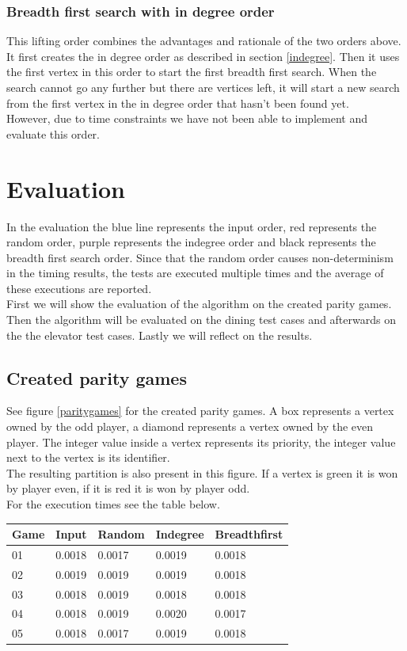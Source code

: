 \documentclass[10pt,a4paper]{article}
\begin{document}
\subsubsection{Breadth first search with in degree order}
This lifting order combines the advantages and rationale of the two orders above. It first creates the in degree order as described in section \ref{indegree}. Then it uses the first vertex in this order to start the first breadth first search. When the search cannot go any further but there are vertices left, it will start a new search from the first vertex in the in degree order that hasn't been found yet.\\
However, due to time constraints we have not been able to implement and evaluate this order. 

\section{Evaluation}\label{eval}

In the evaluation the blue line represents the input order, red represents the random order, purple represents the indegree order and black represents the breadth first search order. Since that the random order causes non-determinism in the timing results, the tests are executed multiple times and the average of these executions are reported.\\
First we will show the evaluation of the algorithm on the created parity games. Then the algorithm will be evaluated on the dining test cases and afterwards on the the elevator test cases. Lastly we will reflect on the results.

\subsection{Created parity games}

See figure \ref{paritygames} for the created parity games. A box represents a vertex owned by the odd player, a diamond represents a vertex owned by the even player. The integer value inside a vertex represents its priority, the integer value next to the vertex is its identifier.\\
The resulting partition is also present in this figure. If a vertex is green it is won by player even, if it is red it is won by player odd.\\
For the execution times see the table below.

\begin{tabular}{l l l l l}
	Game	& Input	 & Random & Indegree & Breadthfirst \\\hline
	01		& 0.0018 & 0.0017 & 0.0019   & 0.0018 \\
	02		& 0.0019 & 0.0019 & 0.0019   & 0.0018 \\
	03		& 0.0018 & 0.0019 & 0.0018 	 & 0.0018 \\
	04		& 0.0018 & 0.0019 & 0.0020	 & 0.0017 \\
	05		& 0.0018 & 0.0017 & 0.0019	 & 0.0018 
\end{tabular}
\end{document}
